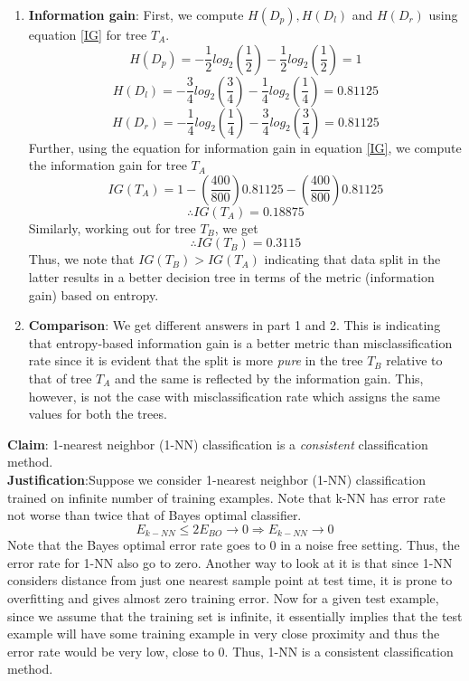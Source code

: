 \documentclass[a4paper,11pt]{article}
\begin{document}
\begin{mlsolution}
\begin{enumerate}
	\item \textbf{Information gain}: First, we compute $H(D_p), H(D_l)$ and $H(D_r)$ using equation \ref{IG} for tree $T_A$. 
	\[
	H(D_p) = - \frac{1}{2}log_{2}(\frac{1}{2}) - \frac{1}{2}log_{2}(\frac{1}{2}) = 1
	\]
	\[
	H(D_l) = -\frac{3}{4}log_{2}(\frac{3}{4}) - \frac{1}{4}log_{2}(\frac{1}{4}) = 0.81125
	\]
	\[
	H(D_r) = -\frac{1}{4}log_{2}(\frac{1}{4}) - \frac{3}{4}log_{2}(\frac{3}{4}) = 0.81125
	\]
	Further, using the equation for information gain in equation \ref{IG}, we compute the information gain for tree $T_A$ 
	\[
	IG(T_A) = 1 - \left(\frac{400}{800}\right)0.81125 - \left(\frac{400}{800}\right)0.81125
	\]
	\[
	\boxed{\therefore IG(T_A) = 0.18875}
	\]
	Similarly, working out for tree $T_B$, we get
	\[
	\boxed{\therefore IG(T_B) = 0.3115}
	\]
	Thus, we note that $IG(T_B) > IG(T_A)$ indicating that data split in the latter results in a better decision tree in terms of the metric (information gain) based on entropy. 
	\item \textbf{Comparison}: We get different answers in part 1 and 2. This is indicating that entropy-based information gain is a better metric than misclassification rate since it is evident that the split is more \textit{pure} in the tree $T_B$ relative to that of tree $T_A$ and the same is reflected by the information gain. This, however, is not the case with misclassification rate which assigns the same values for both the trees.
\end{enumerate} 


\end{mlsolution}

\begin{mlsolution}
	 
\noindent \textbf{Claim}: 1-nearest neighbor (1-NN) classification is a \textit{consistent} classification method. \\
\textbf{Justification}:Suppose we consider 1-nearest neighbor (1-NN) classification trained on infinite number of training examples. Note that k-NN has error rate not worse than twice that of Bayes optimal classifier. 
\[
E_{k-NN} \leq 2E_{BO} \rightarrow 0 \Rightarrow E_{k-NN} \rightarrow 0
\]
Note that the Bayes optimal error rate goes to 0 in a noise free setting. Thus, the error rate for 1-NN also go to zero. Another way to look at it is that since 1-NN considers distance from just one nearest sample point at test time, it is prone to overfitting and gives almost zero training error. Now for a given test example, since we assume that the training set is infinite, it essentially implies that the test example will have some training example in very close proximity and thus the error rate would be very low, close to 0. Thus, 1-NN is a consistent classification method.


\end{mlsolution}
\end{document}
